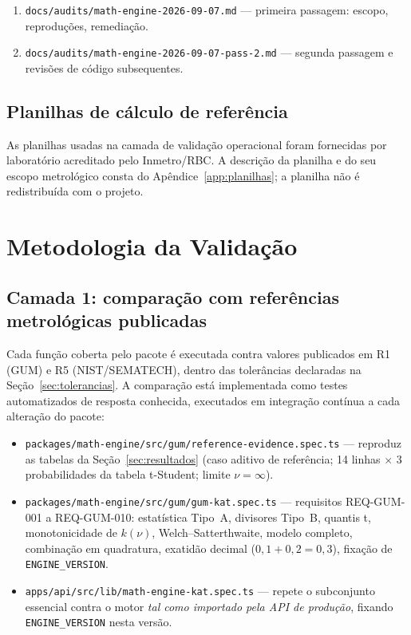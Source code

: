 \documentclass[11pt,a4paper]{article}
\begin{document}
\begin{enumerate}[label=A\arabic*., leftmargin=2.6em]
  \item \texttt{docs/audits/math-engine-2026-09-07.md} --- primeira passagem: escopo, reproduções, remediação.
  \item \texttt{docs/audits/math-engine-2026-09-07-pass-2.md} --- segunda passagem e revisões de código subsequentes.
\end{enumerate}

\subsection{Planilhas de cálculo de referência}

As planilhas usadas na camada de validação operacional foram fornecidas por laboratório acreditado pelo Inmetro/RBC. A descrição da planilha e do seu escopo metrológico consta do Apêndice~\ref{app:planilhas}; a planilha não é redistribuída com o projeto.

\section{Metodologia da Validação}
\label{sec:metodologia}

\subsection{Camada 1: comparação com referências metrológicas publicadas}

Cada função coberta pelo pacote é executada contra valores publicados em R1 (GUM) e R5 (NIST/SEMATECH), dentro das tolerâncias declaradas na Seção~\ref{sec:tolerancias}. A comparação está implementada como testes automatizados de resposta conhecida, executados em integração contínua a cada alteração do pacote:

\begin{itemize}
  \item \texttt{packages/math-engine/src/gum/reference-evidence.spec.ts} --- reproduz as tabelas da Seção~\ref{sec:resultados} (caso aditivo de referência; 14 linhas \(\times\) 3 probabilidades da tabela t-Student; limite \(\nu = \infty\)).
  \item \texttt{packages/math-engine/src/gum/gum-kat.spec.ts} --- requisitos REQ-GUM-001 a REQ-GUM-010: estatística Tipo~A, divisores Tipo~B, quantis t, monotonicidade de \(k(\nu)\), Welch--Satterthwaite, modelo completo, combinação em quadratura, exatidão decimal (\(0{,}1 + 0{,}2 = 0{,}3\)), fixação de \texttt{ENGINE\_VERSION}.
  \item \texttt{apps/api/src/lib/math-engine-kat.spec.ts} --- repete o subconjunto essencial contra o motor \emph{tal como importado pela API de produção}, fixando \texttt{ENGINE\_VERSION} nesta versão.
\end{itemize}
\end{document}

